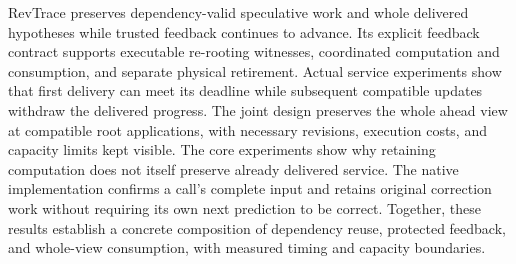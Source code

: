 RevTrace preserves dependency-valid speculative work and whole delivered
hypotheses while trusted feedback continues to advance. Its explicit
feedback contract supports executable re-rooting witnesses, coordinated
computation and consumption, and separate physical retirement. Actual
service experiments show that first delivery can meet its deadline while
subsequent compatible updates withdraw the delivered progress. The joint
design preserves the whole ahead view at compatible root applications,
with necessary revisions, execution costs, and capacity limits kept visible.
The core experiments show why retaining computation does not itself
preserve already delivered service. The native implementation confirms a
call's complete input and retains original correction work without requiring
its own next prediction to be correct. Together, these results establish
a concrete composition of dependency reuse, protected feedback, and
whole-view consumption, with measured timing and capacity boundaries.
